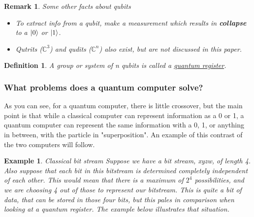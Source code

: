 \documentclass[12pt]{article}
\theoremstyle{plain}
\theoremstyle{nonumberplain}
\theoremstyle{plain}
\newtheorem{definition}[lemma]{Definition}
\newtheorem{example}[lemma]{Example}
\newtheorem{remark}[lemma]{Remark}
\theoremstyle{nonumberplain}
\newcommand\1{{\bf 1}}
\newcommand{\C}{\mathbb{C}} %
\newcommand{\<}{\left\langle}
\renewcommand{\>}{\right\rangle}
\begin{document}
\begin{remark} Some other facts about qubits \\
\begin{itemize}
\item To extract info from a qubit, make a measurement which results in \textbf{collapse} to a $\ket{0}$ or $\ket{1}$.
\item Qutrits ($\C^3$) and qudits ($\C^n$) also exist, but are not discussed in this paper.
\end{itemize}
\end{remark}

\begin{definition}
A group or system of n qubits is called a \underline{quantum register}.
\end{definition}

\subsubsection{What problems does a quantum computer solve?}
As you can see, for a quantum computer, there is little crossover,  but the main point is that while a classical computer can represent information as a 0 or 1, a quantum computer can represent the same information with a 0, 1, or anything in between, with the particle in "superposition".   An example of this contrast of the two computers will follow.

\begin{example} Classical bit stream
Suppose we have a bit stream, xyzw, of length 4.  Also suppose that each bit in this bitstream is determined completely independent of each other.  This would mean that there is a maximum of $2^4$ possibilities, and we are choosing 4 out of those to represent our bitstream.  This is quite a bit of data, that can be stored in those four bits, but this pales in comparison when looking at a  quantum register.  The example below illustrates that situation.
\end{example}
\end{document}

